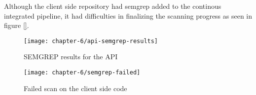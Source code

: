 Although the client side repository had semgrep added to the continous integrated pipeline, it had difficulties in finalizing the scanning progress as seen in figure \ref{}.

\begin{figure}
    \centering
    \texttt{[image: chapter-6/api-semgrep-results]}
    \caption{SEMGREP results for the API}
    \label{fig:api-semgrep}
\end{figure}

\begin{figure}
    \centering
    \texttt{[image: chapter-6/semgrep-failed]}
    \caption{Failed scan on the client side code}
    \label{fig:failed-semgrep-scan}
\end{figure}


